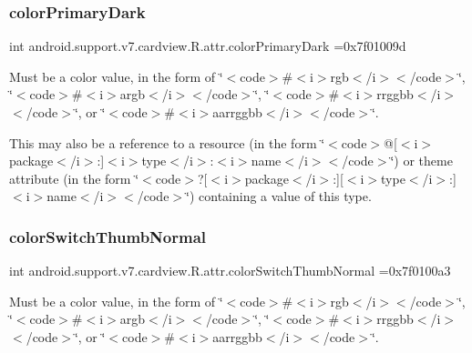 \subsubsection{\texorpdfstring{color\+Primary\+Dark}{colorPrimaryDark}}
{\footnotesize\ttfamily int android.\+support.\+v7.\+cardview.\+R.\+attr.\+color\+Primary\+Dark =0x7f01009d\hspace{0.3cm}{\ttfamily [static]}}

Must be a color value, in the form of \char`\"{}$<$code$>$\#$<$i$>$rgb$<$/i$>$$<$/code$>$\char`\"{}, \char`\"{}$<$code$>$\#$<$i$>$argb$<$/i$>$$<$/code$>$\char`\"{}, \char`\"{}$<$code$>$\#$<$i$>$rrggbb$<$/i$>$$<$/code$>$\char`\"{}, or \char`\"{}$<$code$>$\#$<$i$>$aarrggbb$<$/i$>$$<$/code$>$\char`\"{}. 

This may also be a reference to a resource (in the form \char`\"{}$<$code$>$@\mbox{[}$<$i$>$package$<$/i$>$\+:\mbox{]}$<$i$>$type$<$/i$>$\+:$<$i$>$name$<$/i$>$$<$/code$>$\char`\"{}) or theme attribute (in the form \char`\"{}$<$code$>$?\mbox{[}$<$i$>$package$<$/i$>$\+:\mbox{]}\mbox{[}$<$i$>$type$<$/i$>$\+:\mbox{]}$<$i$>$name$<$/i$>$$<$/code$>$\char`\"{}) containing a value of this type. \mbox{\label{classandroid_1_1support_1_1v7_1_1cardview_1_1R_1_1attr_a826fee7b51341a78531c2b55cea2e1b5}} 
\subsubsection{\texorpdfstring{color\+Switch\+Thumb\+Normal}{colorSwitchThumbNormal}}
{\footnotesize\ttfamily int android.\+support.\+v7.\+cardview.\+R.\+attr.\+color\+Switch\+Thumb\+Normal =0x7f0100a3\hspace{0.3cm}{\ttfamily [static]}}

Must be a color value, in the form of \char`\"{}$<$code$>$\#$<$i$>$rgb$<$/i$>$$<$/code$>$\char`\"{}, \char`\"{}$<$code$>$\#$<$i$>$argb$<$/i$>$$<$/code$>$\char`\"{}, \char`\"{}$<$code$>$\#$<$i$>$rrggbb$<$/i$>$$<$/code$>$\char`\"{}, or \char`\"{}$<$code$>$\#$<$i$>$aarrggbb$<$/i$>$$<$/code$>$\char`\"{}. 

